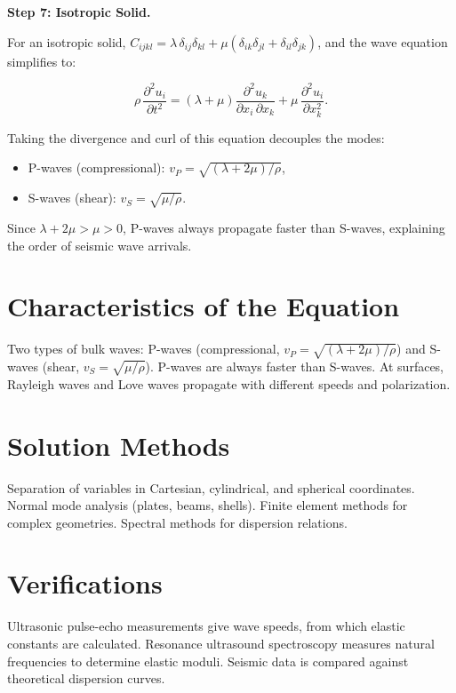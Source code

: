\textbf{Step 7: Isotropic Solid.}

For an isotropic solid, $C_{ijkl} = \lambda\,\delta_{ij}\delta_{kl} + \mu(\delta_{ik}\delta_{jl} + \delta_{il}\delta_{jk})$, and the wave equation simplifies to:

\begin{equation}
\rho\,\frac{\partial^2 u_i}{\partial t^2} = (\lambda + \mu)\frac{\partial^2 u_k}{\partial x_i\,\partial x_k} + \mu\,\frac{\partial^2 u_i}{\partial x_k^2}.
\end{equation}

Taking the divergence and curl of this equation decouples the modes:

\begin{itemize}
\item P-waves (compressional): $v_P = \sqrt{(\lambda + 2\mu)/\rho}$,
\item S-waves (shear): $v_S = \sqrt{\mu/\rho}$.
\end{itemize}

Since $\lambda + 2\mu > \mu > 0$, P-waves always propagate faster than S-waves, explaining the order of seismic wave arrivals.

\section*{Characteristics of the Equation}

Two types of bulk waves: P-waves (compressional, $v_P = \sqrt{(\lambda + 2\mu)/\rho}$) and S-waves (shear, $v_S = \sqrt{\mu/\rho}$). P-waves are always faster than S-waves. At surfaces, Rayleigh waves and Love waves propagate with different speeds and polarization.
\section*{Solution Methods}

Separation of variables in Cartesian, cylindrical, and spherical coordinates. Normal mode analysis (plates, beams, shells). Finite element methods for complex geometries. Spectral methods for dispersion relations.
\section*{Verifications}

Ultrasonic pulse-echo measurements give wave speeds, from which elastic constants are calculated. Resonance ultrasound spectroscopy measures natural frequencies to determine elastic moduli. Seismic data is compared against theoretical dispersion curves.
